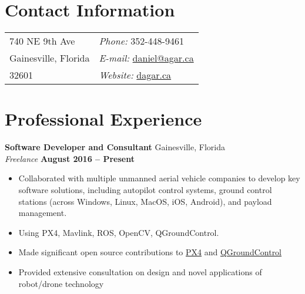 \documentclass[margin,line]{res}
\begin{document}

\begin{resume}


  \section{\sc Contact Information}

    \vspace{.05in}

    \begin{tabular}{@{}p{3.5in}p{4in}}
      740 NE 9th Ave                  & {\it Phone:}  352-448-9461 \\                     
      Gainesville, Florida         & {\it E-mail:}  \href{mailto:daniel@agar.ca}{daniel@agar.ca}\\       
      32601                          & {\it Website:} \href{http://dagar.ca}{dagar.ca} \\     
    \end{tabular}
    
    

  \section{\sc Professional Experience}
        {\bf Software Developer and Consultant} {\hfill Gainesville, Florida}\\
      {\em Freelance} \hfill {\bf August 2016 -- Present}
      \begin{itemize} \itemsep -2pt

	\item Collaborated with multiple unmanned aerial vehicle companies to develop key software solutions, including autopilot control systems, ground control stations (across Windows, Linux, MacOS, iOS, Android), and payload management.
	\item Using PX4, Mavlink, ROS, OpenCV, QGroundControl.
	\item Made significant open source contributions to \href{https://github.com/PX4/Firmware}{PX4} and \href{https://github.com/mavlink/qgroundcontrol}{QGroundControl}
	\item Provided extensive consultation on design and novel applications of robot/drone technology
	

      \end{itemize}


\end{resume}
\end{document}
